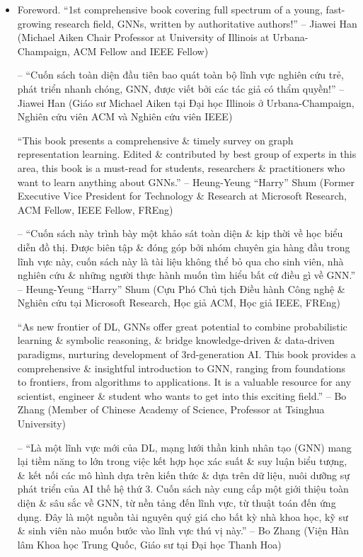 \documentclass{article}
\begin{document}
\begin{itemize}
    \item {\sf Foreword.} ``1st comprehensive book covering full spectrum of a young, fast-growing research field, GNNs, written by authoritative authors!'' -- Jiawei Han (Michael Aiken Chair Professor at University of Illinois at Urbana-Champaign, ACM Fellow and IEEE Fellow)

    -- ``Cuốn sách toàn diện đầu tiên bao quát toàn bộ lĩnh vực nghiên cứu trẻ, phát triển nhanh chóng, GNN, được viết bởi các tác giả có thẩm quyền!'' -- Jiawei Han (Giáo sư Michael Aiken tại Đại học Illinois ở Urbana-Champaign, Nghiên cứu viên ACM và Nghiên cứu viên IEEE)

    ``This book presents a comprehensive \& timely survey on graph representation learning. Edited \& contributed by best group of experts in this area, this book is a must-read for students, researchers \& practitioners who want to learn anything about GNNs.'' -- Heung-Yeung ``Harry'' Shum (Former Executive Vice President for Technology \& Research at Microsoft Research, ACM Fellow, IEEE Fellow, FREng)

    -- ``Cuốn sách này trình bày một khảo sát toàn diện \& kịp thời về học biểu diễn đồ thị. Được biên tập \& đóng góp bởi nhóm chuyên gia hàng đầu trong lĩnh vực này, cuốn sách này là tài liệu không thể bỏ qua cho sinh viên, nhà nghiên cứu \& những người thực hành muốn tìm hiểu bất cứ điều gì về GNN.'' -- Heung-Yeung ``Harry'' Shum (Cựu Phó Chủ tịch Điều hành Công nghệ \& Nghiên cứu tại Microsoft Research, Học giả ACM, Học giả IEEE, FREng)

    ``As new frontier of DL, GNNs offer great potential to combine probabilistic learning \& symbolic reasoning, \& bridge knowledge-driven \& data-driven paradigms, nurturing development of 3rd-generation AI. This book provides a comprehensive \& insightful introduction to GNN, ranging from foundations to frontiers, from algorithms to applications. It is a valuable resource for any scientist, engineer \& student who wants to get into  this exciting field.'' -- Bo Zhang (Member of Chinese Academy of Science, Professor at Tsinghua University)

    -- ``Là một lĩnh vực mới của DL, mạng lưới thần kinh nhân tạo (GNN) mang lại tiềm năng to lớn trong việc kết hợp học xác suất \& suy luận biểu tượng, \& kết nối các mô hình dựa trên kiến thức \& dựa trên dữ liệu, nuôi dưỡng sự phát triển của AI thế hệ thứ 3. Cuốn sách này cung cấp một giới thiệu toàn diện \& sâu sắc về GNN, từ nền tảng đến lĩnh vực, từ thuật toán đến ứng dụng. Đây là một nguồn tài nguyên quý giá cho bất kỳ nhà khoa học, kỹ sư \& sinh viên nào muốn bước vào lĩnh vực thú vị này.'' -- Bo Zhang (Viện Hàn lâm Khoa học Trung Quốc, Giáo sư tại Đại học Thanh Hoa)


\end{itemize}
\end{document}
